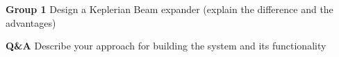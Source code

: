 \documentclass[main.tex]{subfiles}
\begin{document}
\textbf{Group 1} Design a Keplerian Beam expander (explain the difference and the advantages)

\textbf{Q&A} Describe your approach for building the system and its functionality
\end{document}
